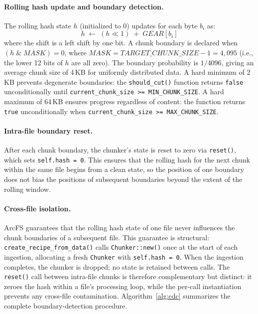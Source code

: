 \documentclass[5p,times]{elsarticle}
\begin{document}
\paragraph{Rolling hash update and boundary detection.}
The rolling hash state $h$ (initialized to 0) updates for each byte
$b_i$ as:
\begin{equation}
  h \;\leftarrow\; (h \ll 1) \;+\; \mathit{GEAR}[b_i]
  \label{eq:gear}
\end{equation}
where the shift is a left shift by one bit.  A chunk boundary is
declared when $(h \;\&\; \mathit{MASK}) = 0$, where
$\mathit{MASK} = \mathit{TARGET\_CHUNK\_SIZE} - 1 = 4{,}095$ (i.e., the
lower 12 bits of $h$ are all zero).  The boundary probability is
$1/4096$, giving an average chunk size of 4\,KB for uniformly distributed
data.  A hard minimum of 2\,KB prevents degenerate boundaries: the
\texttt{should\_cut()} function returns \texttt{false} unconditionally
until \texttt{current\_chunk\_size >= MIN\_CHUNK\_SIZE}.  A hard maximum
of 64\,KB ensures progress regardless of content: the function returns
\texttt{true} unconditionally when \texttt{current\_chunk\_size >= MAX\_CHUNK\_SIZE}.

\paragraph{Intra-file boundary reset.}
After each chunk boundary, the chunker's state is reset to zero via
\texttt{reset()}, which sets \texttt{self.hash = 0}.  This ensures that
the rolling hash for the next chunk within the same file begins from a
clean state, so the position of one boundary does not bias the positions
of subsequent boundaries beyond the extent of the rolling window.

\paragraph{Cross-file isolation.}
ArcFS guarantees that the rolling hash state of one file never influences
the chunk boundaries of a subsequent file.  This guarantee is structural:
\texttt{create\_recipe\_from\_data()} calls \texttt{Chunker::new()} once
at the start of each ingestion, allocating a fresh \texttt{Chunker}
with \texttt{self.hash = 0}.  When the ingestion completes, the chunker
is dropped; no state is retained between calls.  The \texttt{reset()}
call between intra-file chunks is therefore complementary but
distinct: it zeroes the hash within a file's processing loop, while
the per-call instantiation prevents any cross-file contamination.
Algorithm~\ref{alg:cdc} summarizes the complete boundary-detection
procedure.
\end{document}

